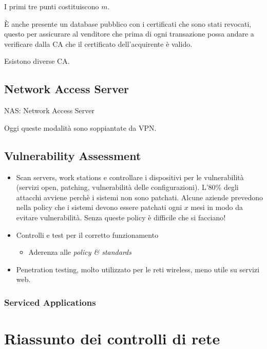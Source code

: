 I primi tre punti costituiscono $m$.

È anche presente un database pubblico con i certificati che sono stati revocati, 
questo per assicurare al venditore che prima di ogni transazione possa andare a 
verificare dalla CA che il certificato dell'acquirente è valido.

Esistono diverse CA.

\subsection{Network Access Server}

NAS: Network Access Server

Oggi queste modalità sono soppiantate da VPN.


\subsection{Vulnerability Assessment}

\begin{itemize}
\item Scan servers, work stations e controllare i dispositivi per le 
vulnerabilità (servizi open, patching, vulnerabilità delle configurazioni). 
L'80\% degli attacchi avviene perchè i sistemi non sono patchati. Alcune aziende 
prevedono nella policy che i sistemi devono essere patchati ogni $x$ mesi in 
modo da evitare vulnerabilità. Senza queste policy è difficile che si facciano!
\item Controlli e test per il corretto funzionamento
\begin{itemize}
 \item Aderenza alle \textit{policy \& standards}
\end{itemize}
\item Penetration testing, molto utilizzato per le reti wireless, meno utile su 
servizi web. 
\end{itemize}

\subsubsection{Serviced Applications}


\section{Riassunto dei controlli di rete}

